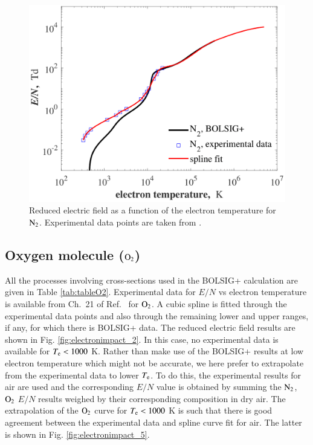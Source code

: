 \begin{figure}[!ht]
\centering     %
\includegraphics[width=0.7\linewidth, angle=0.0]{electronimpact_figs/electronimpact_fig1.png}
\caption{Reduced electric field as a function of the electron temperature for $\rm N_2$. Experimental data points are taken from .}
\label{fig:electronimpact_1}
\end{figure}

\subsection{Oxygen molecule ($\rm O_2$)}

All the processes involving cross-sections used in the BOLSIG+ calculation are given in Table \ref{tab:tableO2}. Experimental data for $E/N$ vs electron temperature is available from Ch.\ 21 of Ref.\  for $\rm O_2$. A cubic spline is fitted through the experimental data points and also through the remaining lower and upper ranges, if any, for which there is BOLSIG+ data.  The reduced electric field results are shown in Fig. \ref{fig:electronimpact_2}. In this case, no experimental data is available for $T_{\rm e}<1000$ K. Rather than make use of the BOLSIG+ results at low electron temperature which might not be accurate, we here prefer to extrapolate from the experimental data to lower $T_{\rm e}$. To do this, the experimental results for air are used and the corresponding $E/N$ value is obtained by summing the $\rm N_2$, $\rm O_2$ $E/N$ results weighed by their corresponding composition in dry air. The extrapolation of the $\rm O_2$ curve for $T_{\rm e}<1000$ K is such that there is good agreement between the experimental data and spline curve fit for air. The latter is shown in Fig. \ref{fig:electronimpact_5}.
%



